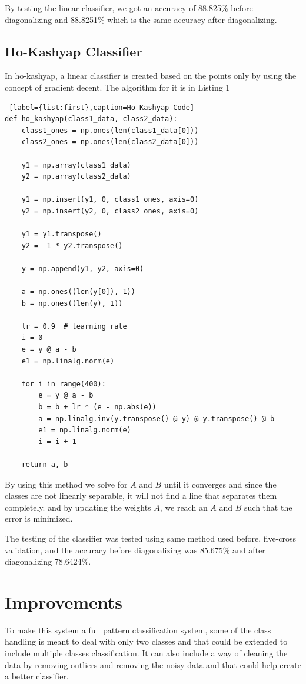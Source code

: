 \documentclass[11pt, oneside]{article}   	%
\begin{document}
By testing the linear classifier, we got an accuracy of 88.825\% before diagonalizing and 88.8251\% which is the same accuracy after diagonalizing.

\subsection{Ho-Kashyap Classifier}
In ho-kashyap, a linear classifier is created based on the points only by using the concept of gradient decent. The algorithm for it is in Listing 1

\begin{lstlisting} [label={list:first},caption=Ho-Kashyap Code]
def ho_kashyap(class1_data, class2_data):
    class1_ones = np.ones(len(class1_data[0]))
    class2_ones = np.ones(len(class2_data[0]))

    y1 = np.array(class1_data)
    y2 = np.array(class2_data)

    y1 = np.insert(y1, 0, class1_ones, axis=0)
    y2 = np.insert(y2, 0, class2_ones, axis=0)

    y1 = y1.transpose()
    y2 = -1 * y2.transpose()

    y = np.append(y1, y2, axis=0)

    a = np.ones((len(y[0]), 1))
    b = np.ones((len(y), 1))

    lr = 0.9  # learning rate
    i = 0
    e = y @ a - b
    e1 = np.linalg.norm(e)

    for i in range(400):
        e = y @ a - b
        b = b + lr * (e - np.abs(e))
        a = np.linalg.inv(y.transpose() @ y) @ y.transpose() @ b
        e1 = np.linalg.norm(e)
        i = i + 1

    return a, b
\end{lstlisting}

By using this method we solve for $A$ and $B$ until it converges and since the classes are not linearly separable, it will not find a line that separates them completely. and by updating the weights $A$, we reach an $A$ and $B$ such that the error is minimized.

The testing of the classifier was tested using same method used before, five-cross validation, and the accuracy before diagonalizing was 85.675\% and after diagonalizing 78.6424\%.

\section*{Improvements}
To make this system a full pattern classification system, some of the class handling is meant to deal with only two classes and that could be extended to include multiple classes classification. It can also include a way of cleaning the data by removing outliers and removing the noisy data and that could help create a better classifier.  
\end{document}
